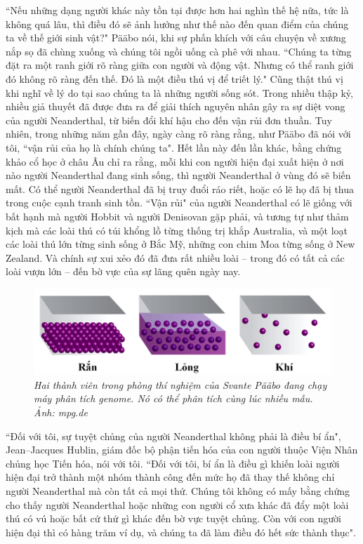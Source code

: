 \begin{multicols}{2}
	\vskip 0.1cm
	``Nếu những dạng người khác này tồn tại được hơn hai nghìn thế hệ nữa, tức là không quá lâu, thì điều đó sẽ ảnh hưởng như thế nào đến quan điểm của chúng ta về thế giới sinh vật?" Pääbo nói, khi sự phấn khích với câu chuyện về xương nắp sọ đã chùng xuống và chúng tôi ngồi uống cà phê với nhau. ``Chúng ta từng đặt ra một ranh giới rõ ràng giữa con người và động vật. Nhưng có thể ranh giới đó không rõ ràng đến thế. Đó là một điều thú vị để triết lý." Cũng thật thú vị khi nghĩ về lý do tại sao chúng ta là những người sống sót.
	\vskip 0.1cm
	Trong nhiều thập kỷ, nhiều giả thuyết đã được đưa ra để giải thích nguyên nhân gây ra sự diệt vong của người Neanderthal, từ biến đổi khí hậu cho đến vận rủi đơn thuần. Tuy nhiên, trong những năm gần đây, ngày càng rõ ràng rằng, như Pääbo đã nói với tôi, ``vận rủi của họ là chính chúng ta". Hết lần này đến lần khác, bằng chứng khảo cổ học ở châu Âu chỉ ra rằng, mỗi khi con người hiện đại xuất hiện ở nơi nào người Neanderthal đang sinh sống, thì người Neanderthal ở vùng đó sẽ biến mất. Có thể người Neanderthal đã bị truy đuổi ráo riết, hoặc có lẽ họ đã bị thua trong cuộc cạnh tranh sinh tồn. ``Vận rủi" của người Neanderthal có lẽ giống với bất hạnh mà người Hobbit và người Denisovan gặp phải, và tương tự như thảm kịch mà các loài thú có túi khổng lồ từng thống trị khắp Australia, và một loạt các loài thú lớn từng sinh sống ở Bắc Mỹ, những con chim Moa từng sống ở New Zealand. Và chính sự xui xẻo đó đã đưa rất nhiều loài -- trong đó có tất cả các loài vượn lớn -- đến bờ vực của sự lãng quên ngày nay.
	\begin{figure}[H]
		\vspace*{-5pt}
		\centering
		\captionsetup{labelformat= empty, justification=centering}
		\includegraphics[width= 1\linewidth]{7}
		\caption{\small\textit{\color{timhieukhoahoc}Hai thành viên trong phòng thí nghiệm của Svante Pääbo đang chạy máy phân tích genome. Nó có thể phân tích cùng lúc nhiều mẫu. Ảnh: mpg.de}}
		\vspace*{-10pt}
	\end{figure}
	``Đối với tôi, sự tuyệt chủng của người Neanderthal không phải là điều bí ẩn", Jean--Jacques Hublin, giám đốc bộ phận tiến hóa của con người thuộc Viện Nhân chủng học Tiến hóa, nói với tôi. ``Đối với tôi, bí ẩn là điều gì khiến loài người hiện đại trở thành một nhóm thành công đến mức họ đã thay thế không chỉ người Neanderthal mà còn tất cả mọi thứ. Chúng tôi không có mấy bằng chứng cho thấy người Neanderthal hoặc những con người cổ xưa khác đã đẩy một loài thú có vú hoặc bất cứ thứ gì khác đến bờ vực tuyệt chủng. Còn với con người hiện đại thì có hàng trăm ví dụ, và chúng ta đã làm điều đó hết sức thành thục".

\end{multicols}
